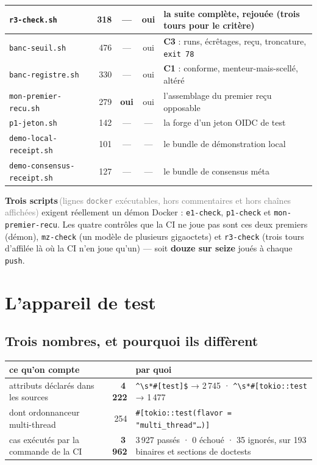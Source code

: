 \documentclass[10pt]{report}
\newcommand{\code}[1]{\texttt{\small #1}}
\newcommand{\ctrois}{\textcolor{c3col}{\textbf{C3}}}
\newcommand{\cun}{\textcolor{c1col}{\textbf{C1}}}
\newcommand{\mesure}[2]{\textbf{#1}\,\footnotesize\textcolor{grey}{(#2)}\normalsize}
\begin{document}
\begin{longtable}{@{}p{4.6cm}r c c p{6.0cm}@{}}
\code{r3-check.sh} & 318 & --- & oui & la suite complète, rejouée (trois tours pour le critère) \\
\midrule
\code{banc-seuil.sh} & 476 & --- & oui & \ctrois{} : runs, écrêtages, reçu, troncature, \code{exit 78} \\
\code{banc-registre.sh} & 330 & --- & oui & \cun{} : conforme, menteur-mais-scellé, altéré \\
\code{mon-premier-recu.sh} & 279 & \textbf{oui} & oui & l'assemblage du premier reçu opposable \\
\code{p1-jeton.sh} & 142 & --- & --- & la forge d'un jeton OIDC de test \\
\code{demo-local-receipt.sh} & 101 & --- & --- & le bundle de démonstration local \\
\code{demo-consensus-receipt.sh} & 127 & --- & --- & le bundle de consensus méta \\
\bottomrule
\end{longtable}

\mesure{Trois scripts}{lignes \code{docker} exécutables, hors commentaires et hors chaînes affichées}
exigent réellement un démon Docker : \code{e1-check}, \code{p1-check} et \code{mon-premier-recu}. Les
quatre contrôles que la CI ne joue pas sont ces deux premiers (démon), \code{mz-check} (un modèle de
plusieurs gigaoctets) et \code{r3-check} (trois tours d'affilée là où la CI n'en joue qu'un) --- soit
\textbf{douze sur seize} joués à chaque \code{push}.

\section{L'appareil de test}

\subsection{Trois nombres, et pourquoi ils diffèrent}

\begin{longtable}{@{}p{7.0cm}r p{6.6cm}@{}}
\toprule \textbf{ce qu'on compte} & & \textbf{par quoi} \\ \midrule \endhead
attributs déclarés dans les sources & \textbf{4\,222} & \code{\textasciicircum{}\textbackslash{}s*\#[test]\$} → 2\,745 · \code{\textasciicircum{}\textbackslash{}s*\#[tokio::test} → 1\,477 \\
\quad dont ordonnanceur multi-thread & 254 & \code{\#[tokio::test(flavor = "multi\_thread"\ldots)]} \\
cas exécutés par la commande de la CI & \textbf{3\,962} & 3\,927 passés · 0 échoué · 35 ignorés, sur 193 binaires et sections de doctests \\
\bottomrule
\end{longtable}
\end{document}
